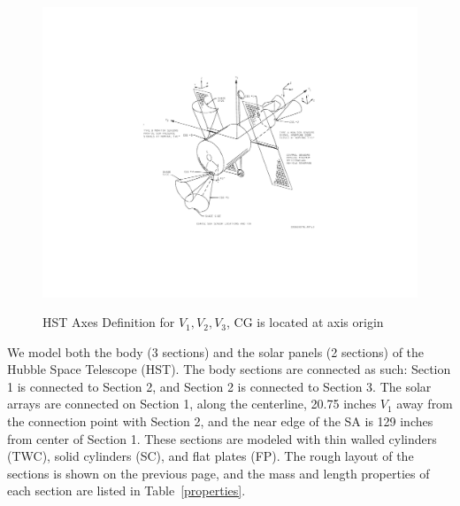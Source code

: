 \documentclass[onecolumn,10pt]{jhwhw}
\begin{document}
\begin{figure}[h!]
\begin{center}
\includegraphics[height=0.4\textheight]{hst_axes.pdf}
\label{fig:on}
\end{center}
\caption{HST Axes Definition for $V_1, V_2, V_3$, CG is located at axis origin}
\end{figure}

We model both the body (3 sections) and the solar panels (2 sections) of the Hubble Space Telescope (HST). The body sections are connected as such: Section 1 is connected to Section 2, and Section 2 is connected to Section 3. The solar arrays are connected on Section 1, along the centerline, 20.75 inches $V_1$ away from the connection point with Section 2, and the near edge of the SA is 129 inches from center of Section 1. These sections are modeled with thin walled cylinders (TWC), solid cylinders (SC), and flat plates (FP). The rough layout of the sections is shown on the previous page, and the mass and length properties of each section are listed in Table~\ref{properties}.
\end{document}
